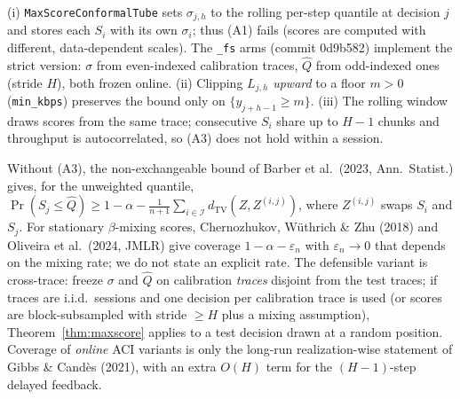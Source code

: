 \begin{remark}
(i) \texttt{MaxScoreConformalTube} sets $\sigma_{j,h}$ to the rolling per-step quantile at decision $j$ and stores
each $S_i$ with its own $\sigma_i$; thus (A1) fails (scores are computed with different, data-dependent scales).
The \texttt{\_fs} arms (commit 0d9b582) implement the strict version: $\sigma$ from even-indexed calibration traces, $\widehat Q$ from odd-indexed ones (stride $H$), both frozen online.
(ii) Clipping $L_{j,h}$ \emph{upward} to a floor $m>0$ (\texttt{min\_kbps}) preserves the bound only on
$\{y_{j+h-1}\ge m\}$. (iii) The rolling window draws scores from the same trace; consecutive $S_i$ share up to
$H-1$ chunks and throughput is autocorrelated, so (A3) does not hold within a session.
\end{remark}

\begin{remark}
Without (A3), the non-exchangeable bound of Barber et al.\ (2023, Ann.\ Statist.) gives, for the unweighted
quantile, $\Pr(S_j\le\widehat Q)\ge 1-\alpha-\frac{1}{n+1}\sum_{i\in\mathcal I} d_{\mathrm{TV}}(Z,Z^{(i,j)})$,
where $Z^{(i,j)}$ swaps $S_i$ and $S_j$. For stationary $\beta$-mixing scores, Chernozhukov, W\"uthrich \& Zhu
(2018) and Oliveira et al.\ (2024, JMLR) give coverage $1-\alpha-\varepsilon_n$ with $\varepsilon_n\to0$ that depends on
the mixing rate; we do not state an explicit rate. The defensible variant is cross-trace: freeze $\sigma$
and $\widehat Q$ on calibration \emph{traces} disjoint from the test traces; if traces are i.i.d.\ sessions and
one decision per calibration trace is used (or scores are block-subsampled with stride $\ge H$ plus a mixing
assumption), Theorem~\ref{thm:maxscore} applies to a test decision drawn at a random position. Coverage of
\emph{online} ACI variants is only the long-run realization-wise statement of Gibbs \& Cand\`es (2021),
with an extra $O(H)$ term for the $(H-1)$-step delayed feedback.
\end{remark}

